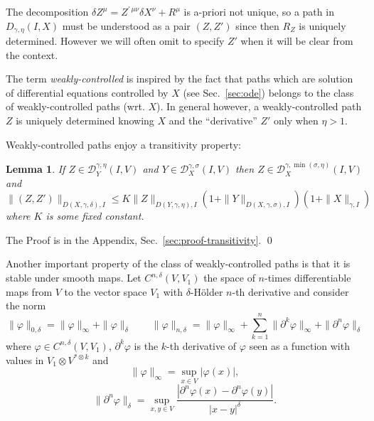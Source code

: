 \documentclass[a4paper,12pt,reqno]{amsproc}
\newcommand{\der}{\delta\!}
\newcommand{\DD}{\mathcal{D}}
\newtheorem{lemma}{Lemma}
\begin{document}
The decomposition $\der Z^\mu =  Z^{\prime\,\mu\nu} \der X^\nu + R^\mu$ is a-priori not
unique, so a path in $D_{\gamma,\eta}(I,X)$ must be understood as a
pair $(Z,Z')$ since then $R_Z$ is uniquely determined. However we will
often omit to specify $Z'$ when it will be clear from the context.

The term \emph{weakly-controlled} is inspired by the fact that paths
which are solution of differential equations controlled by $X$ (see
Sec.~\ref{sec:ode}) belongs to the class of weakly-controlled paths
(wrt. $X$). In general however, a weakly-controlled path $Z$ is 
uniquely determined knowing $X$ and the ``derivative'' $Z'$ only when
$\eta > 1$. 

Weakly-controlled paths enjoy  a transitivity property:
\begin{lemma}
  \label{lemma:transitivity}
If $Z \in
\DD_Y^{\gamma,\eta}(I,V)$ and $Y \in \DD_X^{\gamma,\sigma}(I,V)$ then $Z \in
\DD_X^{\gamma,\min(\sigma,\eta)}(I,V)$ and
\begin{equation*}
\|(Z,Z')\|_{D(X,\gamma,\delta),I} 
\le K \|Z\|_{D(Y,\gamma,\eta),I} (1+
   \|Y\|_{D(X,\gamma,\sigma),I})(1+ \|X\|_{\gamma,I})
\end{equation*}
where $K$ is some fixed constant.
\end{lemma}
\proof The Proof is in the Appendix,
Sec.~\ref{sec:proof-transitivity}. \qed

\bigskip
Another important property of the class of weakly-controlled paths 
is that it is
stable under smooth maps. Let $C^{n,\delta}(V,V_1)$ the space of $n$-times
differentiable maps from $V$ to the vector space $V_1$ with
$\delta$-H\"older $n$-th derivative and consider the norm
$$
\|\varphi\|_{0,\delta} = \|\varphi\|_\infty + \| \varphi\|_\delta
\qquad \|\varphi\|_{n,\delta} = \|\varphi\|_\infty + \sum_{k=1}^n
\|\partial^k \varphi \|_{\infty} + \|\partial^n \varphi\|_\delta
$$
where $\varphi \in C^{n,\delta}(V,V_1)$, $\partial^k \varphi$ is the
$k$-th derivative of $\varphi$ seen as a  function with values in
$V_1 \otimes V^{* \otimes k}$  and 
$$
\|\varphi \|_\infty = \sup_{x\in V} |\varphi(x)|,
$$
$$
\|\partial^n \varphi\|_\delta = \sup_{x,y \in V} \frac{|\partial^n
  \varphi(x) - \partial^n \varphi(y)|}{|x-y|^\delta}.
$$
\end{document}
